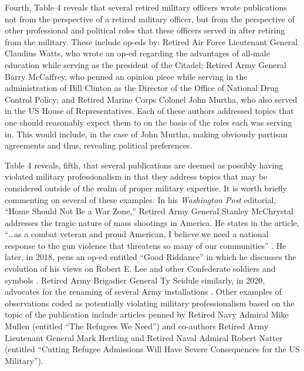 \documentclass[12pt,]{article}
\begin{document}
Fourth, Table 4 reveals that several retired military officers wrote publications not from the perspective of a retired military officer, but from the perspective of other professional and political roles that these officers served in after retiring from the military. These include op-eds by: Retired Air Force Lieutenant General Claudius Watts, who wrote an op-ed regarding the advantages of all-male education while serving as the president of the Citadel; Retired Army General Barry McCaffrey, who penned an opinion piece while serving in the administration of Bill Clinton as the Director of the Office of National Drug Control Policy; and Retired Marine Corps Colonel John Murtha, who also served in the US House of Representatives. Each of these authors addressed topics that one should reasonably expect them to on the basis of the roles each was serving in. This would include, in the case of John Murtha, making obviously partisan agreements and thus, revealing political preferences.

Table 4 reveals, fifth, that several publications are deemed as possibly having violated military professionalism in that they address topics that may be considered outside of the realm of proper military expertise. It is worth briefly commenting on several of these examples. In his \emph{Washington Post} editorial, ``Home Should Not Be a War Zone,'' Retired Army General Stanley McChrystal addresses the tragic nature of mass shootings in America. He states in the article, ``\ldots{}as a combat veteran and proud American, I believe we need a national response to the gun violence that threatens so many of our communities'' \autocite{mcchrystal_home_2016}. He later, in 2018, pens an op-ed entitled ``Good Riddance'' in which he discusses the evolution of his views on Robert E. Lee and other Confederate soldiers and symbols \autocite{mcchyrstal_stanley_good_2018}. Retired Army Brigadier General Ty Seidule similarly, in 2020, advocates for the renaming of several Army installations \autocite{seidule_ty_what_2020}. Other examples of observations coded as potentially violating military professionalism based on the topic of the publication include articles penned by Retired Navy Admiral Mike Mullen (entitled ``The Refugees We Need'') and co-authors Retired Army Lieutenant General Mark Hertling and Retired Naval Admiral Robert Natter (entitled ``Cutting Refugee Admissions Will Have Severe Consequences for the US Military'').
\end{document}
